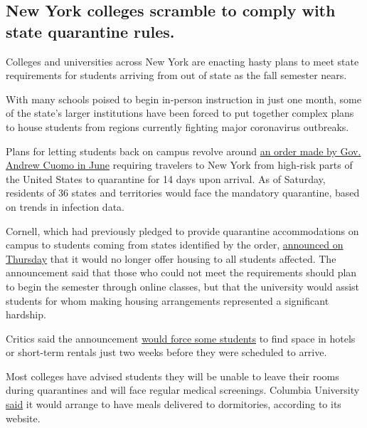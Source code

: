 \hypertarget{new-york-colleges-scramble-to-comply-with-state-quarantine-rules}{%
\subsection{New York colleges scramble to comply with state quarantine
rules.}\label{new-york-colleges-scramble-to-comply-with-state-quarantine-rules}}

Colleges and universities across New York are enacting hasty plans to
meet state requirements for students arriving from out of state as the
fall semester nears.

With many schools poised to begin in-person instruction in just one
month, some of the state's larger institutions have been forced to put
together complex plans to house students from regions currently fighting
major coronavirus outbreaks.

Plans for letting students back on campus revolve around
\href{https://www.nytimes3xbfgragh.onion/2020/06/24/nyregion/ny-coronavirus-states-quarantine.html}{an
order made by Gov. Andrew Cuomo in June} requiring travelers to New York
from high-risk parts of the United States to quarantine for 14 days upon
arrival. As of Saturday, residents of 36 states and territories would
face the mandatory quarantine, based on trends in infection data.

Cornell, which had previously pledged to provide quarantine
accommodations on campus to students coming from states identified by
the order,
\href{https://covid.cornell.edu/updates/20200730-important-updates.cfm}{announced
on Thursday} that it would no longer offer housing to all students
affected. The announcement said that those who could not meet the
requirements should plan to begin the semester through online classes,
but that the university would assist students for whom making housing
arrangements represented a significant hardship.

Critics said the announcement
\href{https://cornellsun.com/2020/07/31/editorial-cornells-inability-to-quarantine-arriving-students-should-concern-you/}{would
force some students} to find space in hotels or short-term rentals just
two weeks before they were scheduled to arrive.

Most colleges have advised students they will be unable to leave their
rooms during quarantines and will face regular medical screenings.
Columbia University
\href{https://roomselection.housing.columbia.edu/}{said} it would
arrange to have meals delivered to dormitories, according to its
website.

